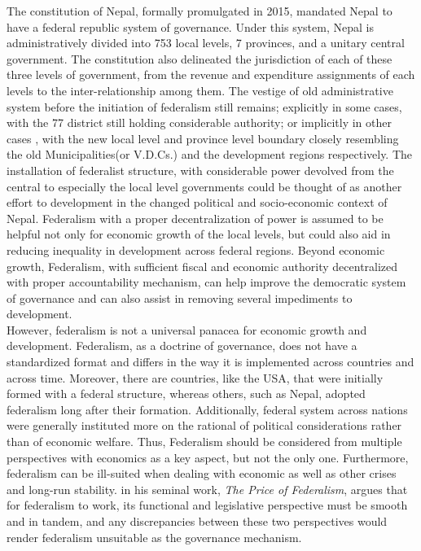 The constitution of Nepal, formally promulgated in 2015, mandated Nepal to have a federal republic system of governance. Under this system, Nepal is administratively divided into 753 local levels, 7 provinces, and a unitary central government. The constitution also delineated the jurisdiction of each of these three levels of government, from the revenue and expenditure assignments of each levels to the inter-relationship among them. The vestige of old administrative system before the initiation of federalism still remains; explicitly in some cases, with the 77 district still holding considerable authority; or implicitly in other cases , with the new local level and province level boundary closely resembling the old Municipalities(or V.D.Cs.) and the development regions respectively. The installation of federalist structure, with considerable power devolved from the central to especially the local level governments could be thought of as another effort to development in the changed political and socio-economic context of Nepal. Federalism with a proper decentralization of power is assumed to be helpful not only for economic growth of the local levels\cite{Iimi2005,Sasana2019,Carniti2019},  but could also aid in reducing inequality in development across federal regions\cite{Baskaran2016}. Beyond economic growth, Federalism, with sufficient fiscal and economic authority decentralized with proper accountability mechanism, can help improve the democratic system of governance and can also assist in removing several impediments to development\cite{Weingast2014}.\\
However, federalism is not a universal panacea for economic growth and development. Federalism, as a doctrine of governance, does not have a standardized format and differs in the way it is implemented across countries and across time. Moreover, there are countries, like the USA, that were initially formed with a federal structure\cite{Sargent2012}, whereas others, such as Nepal, adopted federalism long after their formation. Additionally, federal system across nations were generally instituted more on the rational of political considerations rather than of economic welfare\cite{Riker1964}.  Thus, Federalism should be considered from multiple perspectives with economics as a key aspect, but not the only one. Furthermore, federalism can be ill-suited  when dealing with economic as well as other crises and long-run stability\cite{Huberfeld2020}.  in his seminal work, \textit{The Price of Federalism}, argues that for federalism to  work, its functional and legislative perspective must be smooth and in tandem, and any discrepancies between these two perspectives would render federalism unsuitable as the governance mechanism.  \\

